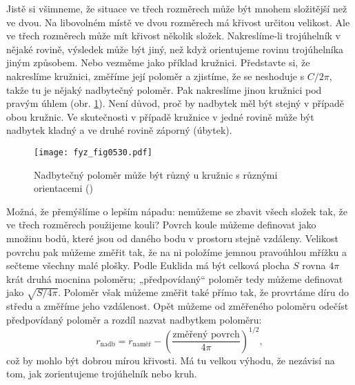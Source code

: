     Jistě si všimneme, že situace ve třech rozměrech může být mnohem složitější než ve dvou. Na 
    libovolném místě ve dvou rozměrech má křivost určitou velikost. Ale ve třech rozměrech může mít 
    křivost několik složek. Nakreslíme-li trojúhelník v nějaké rovině, výsledek může být jiný, než 
    když orientujeme rovinu trojúhelníka jiným způsobem. Nebo vezměme jako příklad kružnici. 
    Představte si, že nakreslíme kružnici, změříme její poloměr a zjistíme, že se neshoduje s 
    \(C/2\pi\), takže tu je nějaký nadbytečný poloměr. Pak nakreslíme jinou kružnici pod pravým 
    úhlem (obr. \ref{fyz:fig0530}). Není důvod, proč by nadbytek měl být stejný v případě obou 
    kružnic. Ve skutečnosti v případě kružnice v jedné rovině může být nadbytek kladný a ve druhé 
    rovině záporný (úbytek).
    
    \begin{figure}[ht!] %
      \centering
      \texttt{[image: fyz\_fig0530.pdf]}
      \caption{Nadbytečný poloměr může být různý u kružnic s různými orientacemi      
               (\cite[s.~782]{Feynman02})}
      \label{fyz:fig0530}
    \end{figure}
    
    Možná, že přemýšlíme o lepším nápadu: nemůžeme se zbavit všech složek tak, že ve třech 
    rozměrech použijeme kouli? Povrch koule můžeme definovat jako množinu bodů, které jsou od 
    daného bodu v prostoru stejně vzdáleny. Velikost povrchu pak můžeme změřit tak, že na ni 
    položíme jemnou pravoúhlou mřížku a sečteme všechny malé plošky. Podle Euklida má být celková 
    plocha \(S\) rovna \(4\pi\) krát druhá mocnina poloměru; „předpovídaný“ poloměr tedy můžeme 
    definovat jako \(\sqrt{S/4\pi}\). Poloměr však můžeme změřit také přímo tak, že provrtáme díru 
    do středu a změříme jeho vzdálenost. Opět můžeme od změřeného poloměru odečíst předpovídaný 
    poloměr a rozdíl nazvat nadbytkem poloměru:
    \begin{equation*}
      r_{\text{nadb}} = r_{\text{naměř}} -\left(\dfrac{\text{změřený povrch}}{4\pi}\right)^{1/2},
    \end{equation*}
    což by mohlo být dobrou mírou křivosti. Má tu velkou výhodu, že nezávisí na tom, jak 
    zorientujeme trojúhelník nebo kruh.
    
